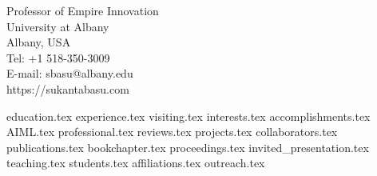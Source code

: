 \documentclass[letterpaper,11pt]{article}
\begin{document}
{{\Large Professor of Empire Innovation}\\
University at Albany\\ 
Albany, USA\\
Tel:  +1 518-350-3009\\
E-mail: sbasu@albany.edu\\
https://sukantabasu.com 
}


{education.tex}
{experience.tex}
{visiting.tex}
{interests.tex}
{accomplishments.tex}
{AIML.tex}
 {professional.tex}
{reviews.tex}
{projects.tex}
{collaborators.tex}
{publications.tex}
{bookchapter.tex}
{proceedings.tex}
{invited_presentation.tex}
{teaching.tex} {students.tex}
{affiliations.tex}
{outreach.tex}


\end{document}
